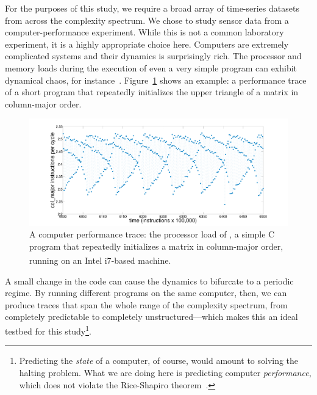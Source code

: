 For the purposes of this study, we require a broad array of
time-series datasets from across the complexity spectrum.  We chose to
study sensor data from a computer-performance experiment.  While this
is not a common laboratory experiment, it is a highly appropriate
choice here.  Computers are extremely complicated systems and their
dynamics is surprisingly rich.
The processor and memory loads during the execution of even a very
simple program can exhibit dynamical chaos, for
instance~\cite{mytkowicz09}.  Figure~\ref{fig:col-ipc} shows an
example: a performance trace of a short program that repeatedly
initializes the upper triangle of a matrix in column-major order.
%
 \begin{figure}[htbp]
    \centering
    \includegraphics[width=\columnwidth]{figs/colshortts}
    \caption{A computer performance trace: the processor load of \col,
      a simple C program that repeatedly initializes a matrix in
      column-major order, running on an Intel
      i7\textsuperscript{\textregistered}-based machine.}
   \label{fig:col-ipc}
  \end{figure}
%
A small change in the code can cause the dynamics to bifurcate to a
periodic regime.  
% 
By running different programs on the same computer, then, we can
produce traces that span the whole range of the complexity spectrum,
from completely predictable to completely unstructured---which makes
this an ideal testbed for this study\footnote{Predicting the
  \emph{state} of a computer, of course, would amount to solving the
  halting problem.  What we are doing here is predicting computer
  \emph{performance}, which does not violate the Rice-Shapiro
  theorem~\cite{hopcroft2007}.}.


